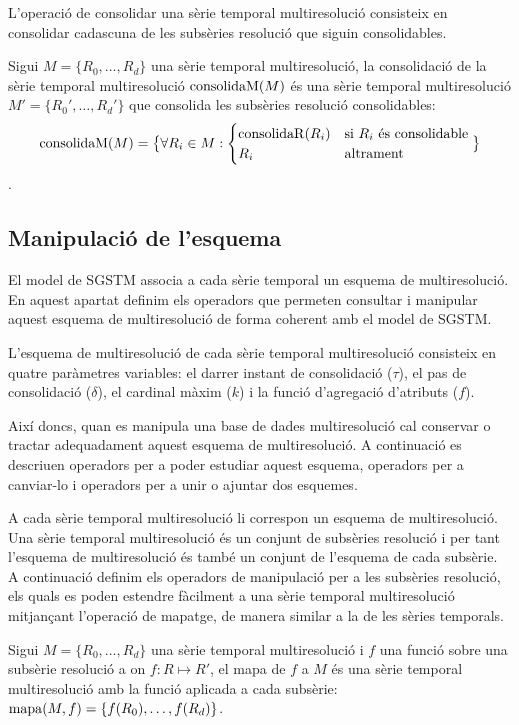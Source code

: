 L'operació de consolidar una sèrie temporal multiresolució consisteix
en consolidar cadascuna de les subsèries resolució que siguin
consolidables.

\begin{definition}
  Sigui $M=\{R_0,\dotsc,R_d\}$ una sèrie temporal multiresolució, la
  consolidació de la sèrie temporal multiresolució $\operatorname*{consolidaM}(M)$ és una
  sèrie temporal multiresolució $M'=\{R_0',\dotsc,R_d'\}$ que
  consolida les subsèries resolució consolidables:
  \[
  \operatorname*{consolidaM}(M) = \big\{ \forall R_i\in M:
  \begin{cases}
    \operatorname*{consolidaR}(R_i) & \text{si } R_i \text{ és consolidable} \\
    R_i & \text{altrament}
  \end{cases}\big\}
  \].
\end{definition}





\subsection{Manipulació de l'esquema}

El model de SGSTM associa a cada sèrie temporal un esquema de
multiresolució. En aquest apartat definim els operadors que permeten
consultar i manipular aquest esquema de multiresolució de forma
coherent amb el model de SGSTM.

L'esquema de multiresolució de cada sèrie temporal multiresolució
consisteix en quatre paràmetres variables: el darrer instant de
consolidació ($\tau$), el pas de consolidació ($\delta$), el cardinal
màxim ($k$) i la funció d'agregació d'atributs ($f$).

Així doncs, quan es manipula una base de dades multiresolució cal
conservar o tractar adequadament aquest esquema de multiresolució.  A
continuació es descriuen operadors per a poder estudiar aquest
esquema, operadors per a canviar-lo i operadors per a unir o ajuntar
dos esquemes.


A cada sèrie temporal multiresolució li correspon un esquema de
multiresolució.  Una sèrie temporal multiresolució és un conjunt de
subsèries resolució i per tant l'esquema de multiresolució és també un
conjunt de l'esquema de cada subsèrie.  A continuació definim els
operadors de manipulació per a les subsèries resolució, els quals es
poden estendre fàcilment a una sèrie temporal multiresolució
mitjançant l'operació de mapatge, de manera similar a la de les sèries
temporals.
 \begin{definition} %
   Sigui $M=\{R_0,\dotsc,R_d\}$ una sèrie temporal multiresolució i
   $f$ una funció sobre una subsèrie resolució a on $f:R\mapsto R'$,
   el mapa de $f$ a $M$ és una sèrie temporal multiresolució amb la
   funció aplicada a cada subsèrie: $\operatorname*{mapa}(M,f) = \{ f(R_0), \dotsc,
   f(R_d) \}$.
\end{definition}


